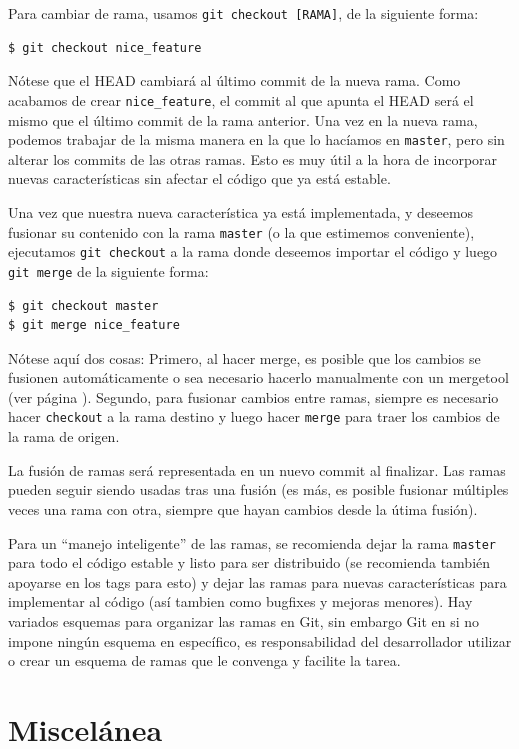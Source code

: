 \documentclass{article}
\begin{document}
Para cambiar de rama, usamos \texttt{git checkout [RAMA]}, de la siguiente forma:
\begin{verbatim}
$ git checkout nice_feature
\end{verbatim}

Nótese que el HEAD cambiará al último commit de la nueva rama. Como acabamos de crear \texttt{nice\_feature}, el commit al que apunta el HEAD será el mismo que el último commit de la rama anterior. Una vez en la nueva rama, podemos trabajar de la misma manera en la que lo hacíamos en \texttt{master}, pero sin alterar los commits de las otras ramas. Esto es muy útil a la hora de incorporar nuevas características sin afectar el código que ya está estable.

Una vez que nuestra nueva característica ya está implementada, y deseemos fusionar su contenido con la rama \texttt{master} (o la que estimemos conveniente), ejecutamos \texttt{git checkout} a la rama donde deseemos importar el código y luego \texttt{git merge} de la siguiente forma:
\begin{verbatim}
$ git checkout master
$ git merge nice_feature
\end{verbatim}

Nótese aquí dos cosas: Primero, al hacer merge, es posible que los cambios se fusionen automáticamente o sea necesario hacerlo manualmente con un mergetool (ver página \pageref{merge}). Segundo, para fusionar cambios entre ramas, siempre es necesario hacer \texttt{checkout} a la rama destino y luego hacer \texttt{merge} para traer los cambios de la rama de origen.

La fusión de ramas será representada en un nuevo commit al finalizar. Las ramas pueden seguir siendo usadas tras una fusión (es más, es posible fusionar múltiples veces una rama con otra, siempre que hayan cambios desde la útima fusión).

Para un ``manejo inteligente'' de las ramas, se recomienda dejar la rama \texttt{master} para todo el código estable y listo para ser distribuido (se recomienda también apoyarse en los tags para esto) y dejar las ramas para nuevas características para implementar al código (así tambien como bugfixes y mejoras menores). Hay variados esquemas para organizar las ramas en Git, sin embargo Git en si no impone ningún esquema en específico, es responsabilidad del desarrollador utilizar o crear un esquema de ramas que le convenga y facilite la tarea.

\pagebreak

\section{Miscelánea}\label{misc}
\end{document}
